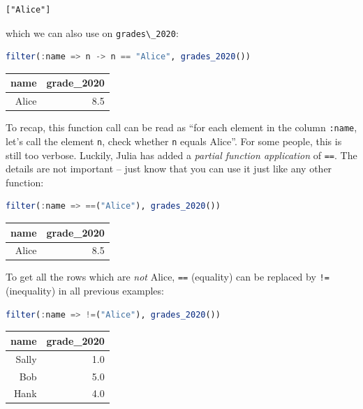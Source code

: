 \documentclass[
  notoc %
]{tufte-book}
\newcommand{\passthrough}[1]{#1}
\begin{document}
\begin{lstlisting}[language=Output]
["Alice"]
\end{lstlisting}

which we can also use on \passthrough{\lstinline!grades\_2020!}:

\begin{lstlisting}[language=Julia]
filter(:name => n -> n == "Alice", grades_2020())
\end{lstlisting}

\begin{longtable}[]{@{}rr@{}}
\toprule()
name & grade\_2020 \\
\midrule()
\endhead
Alice & 8.5 \\
\bottomrule()
\end{longtable}

To recap, this function call can be read as ``for each element in the
column \passthrough{\lstinline!:name!}, let's call the element
\passthrough{\lstinline!n!}, check whether \passthrough{\lstinline!n!}
equals Alice''. For some people, this is still too verbose. Luckily,
Julia has added a \emph{partial function application} of
\passthrough{\lstinline!==!}. The details are not important -- just know
that you can use it just like any other function:

\begin{lstlisting}[language=Julia]
filter(:name => ==("Alice"), grades_2020())
\end{lstlisting}

\begin{longtable}[]{@{}rr@{}}
\toprule()
name & grade\_2020 \\
\midrule()
\endhead
Alice & 8.5 \\
\bottomrule()
\end{longtable}

To get all the rows which are \emph{not} Alice,
\passthrough{\lstinline!==!} (equality) can be replaced by
\passthrough{\lstinline"!="} (inequality) in all previous examples:

\begin{lstlisting}[language=Julia]
filter(:name => !=("Alice"), grades_2020())
\end{lstlisting}

\begin{longtable}[]{@{}rr@{}}
\toprule()
name & grade\_2020 \\
\midrule()
\endhead
Sally & 1.0 \\
Bob & 5.0 \\
Hank & 4.0 \\
\bottomrule()
\end{longtable}
\end{document}
